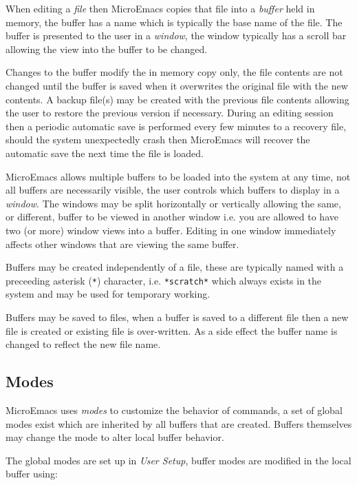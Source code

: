 \documentclass[11pt,a4paper,pdftex]{article}
\begin{document}
  When editing a \textit{file} then MicroEmacs copies that file into a
  \textit{buffer} held in memory, the buffer has a name which is typically the
  base name of the file. The buffer is presented to the user in a
  \textit{window}, the window typically has a scroll bar allowing the view
  into the buffer to be changed.

  Changes to the buffer modify the in memory copy only, the file contents are
  not changed until the buffer is saved when it overwrites the original file
  with the new contents. A backup file(s) may be created with the previous
  file contents allowing the user to restore the previous version if
  necessary. During an editing session then a periodic automatic save is
  performed every few minutes to a recovery file, should the system
  unexpectedly crash then MicroEmacs will recover the automatic save the next
  time the file is loaded.

  MicroEmacs allows multiple buffers to be loaded into the system at any time,
  not all buffers are necessarily visible, the user controls which buffers to
  display in a \textit{window}. The windows may be split horizontally or
  vertically allowing the same, or different, buffer to be viewed in another
  window i.e. you are allowed to have two (or more) window views into a
  buffer. Editing in one window immediately affects other windows that are
  viewing the same buffer.

  Buffers may be created independently of a file, these are typically named
  with a preceeding asterisk (\texttt{*}) character, i.e. \texttt{*scratch*}
  which always exists in the system and may be used for temporary working.

  Buffers may be saved to files, when a buffer is saved to a different file
  then a new file is created or existing file is over-written. As a side
  effect the buffer name is changed to reflect the new file name.

\subsection{Modes}

  MicroEmacs uses \textit{modes} to customize the behavior of commands, a set
  of global modes exist which are inherited by all buffers that are created.
  Buffers themselves may change the mode to alter local buffer behavior.

  The global modes are set up in \textit{User Setup}, buffer modes are
  modified in the local buffer using:
\end{document}
